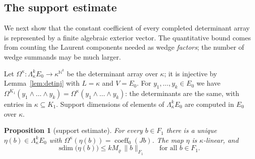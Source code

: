 \documentclass[11pt]{amsart}
\newtheorem{proposition}[theorem]{Proposition}
\theoremstyle{definition}
\theoremstyle{remark}
\numberwithin{equation}{section}
\newcommand{\N}{\mathbb N}
\newcommand{\norm}[1]{\lVert #1\rVert}
\newcommand{\coeff}{\operatorname{coeff}}
\newcommand{\sdim}{\operatorname{sdim}}
\theoremstyle{plain}
\theoremstyle{definition}
\theoremstyle{plain}
\begin{document}
\subsection{The support estimate}\label{ssec:suppest}
We next show that the constant coefficient of every completed determinant array is represented by a finite
algebraic exterior vector. The quantitative bound comes from counting the Laurent components needed as wedge
\emph{factors}; the number of wedge summands may be much larger.

Let $\Omega^\kappa\colon\Lambda^k_\kappa E_0\to\kappa^{\N^k}$ be the determinant array over $\kappa$; it is injective by
Lemma~\ref{lem:detinj} with $L=\kappa$ and $V=E_0$. For $y_1,\dots,y_k\in E_0$ we have
$\Omega^{K_1}(y_1\wedge\dots\wedge y_k)=\Omega^\kappa(y_1\wedge\dots\wedge y_k)$: the determinants are the same, with entries in
$\kappa\subseteq K_1$. Support dimensions of elements of $\Lambda^k_\kappa E_0$ are computed in $E_0$ over $\kappa$.

\begin{proposition}[support estimate]\label{prop:supp}
For every $b\in F_1$ there is a unique $\eta(b)\in\Lambda^k_\kappa E_0$ with $\Omega^\kappa(\eta(b))=\coeff_0(Jb)$. The map $\eta$ is
$\kappa$\nobreakdash-linear, and
\begin{equation}\label{eq:suppest}
\sdim\bigl(\eta(b)\bigr)\le kM_\varrho\,\norm b_{F_1}\qquad\text{for all }b\in F_1 .
\end{equation}
\end{proposition}
\end{document}
